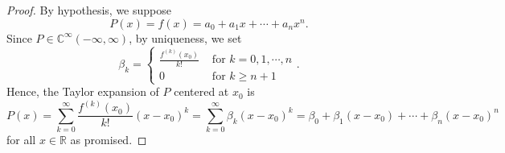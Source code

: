 \begin{Exercise}
\begin{proof}
By hypothesis, we suppose $$P(x) = f(x) = a_0+a_1 x + \cdots + a_n x^n.$$
Since $P\in \mathbb{C}^{\infty}(-\infty, \infty)$, by uniqueness, we set $$\beta_k = \begin{cases} \frac{f^{(k)}(x_0)}{k!} & \mbox{ for } k=0, 1, \cdots, n \\
0 & \mbox{ for } k \geq n+1 \end{cases}.$$
Hence, the Taylor expansion of $P$ centered at $x_0$ is $$P(x) = \sum_{k=0}^{\infty}\frac{f^{(k)}(x_0)}{k!} (x-x_0)^k =
\sum_{k=0}^{\infty}\beta_k (x-x_0)^k =
\beta_0 + \beta_1(x-x_0)+\cdots+\beta_n(x-x_0)^n$$ for all $x\in\mathbb{R}$ as promised.
\end{proof}
\end{Exercise}